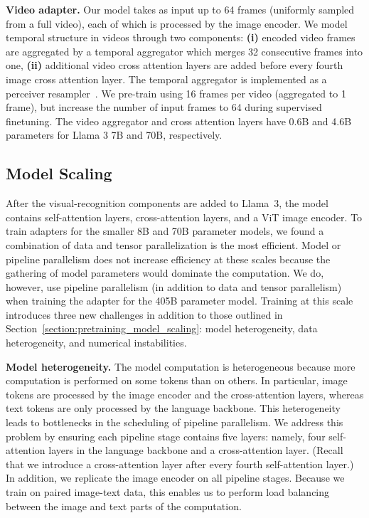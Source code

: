 \textbf{Video adapter.} Our model takes as input up to 64 frames (uniformly sampled from a full video), each of which is processed by the image encoder. We model temporal structure in videos through two components: \textbf{(i)} encoded video frames are aggregated by a temporal aggregator which merges 32 consecutive frames into one, \textbf{(ii)} additional video cross attention layers are added before every fourth image cross attention layer. The temporal aggregator is implemented as a perceiver resampler~\citep{jaegle2021perceiver,alayrac2022flamingo}. We pre-train using 16 frames per video (aggregated to 1 frame), but increase the number of input frames to 64 during supervised finetuning. The video aggregator and cross attention layers have 0.6B and 4.6B parameters for Llama 3 7B and 70B, respectively. 

\subsection{Model Scaling}
\label{section:vision_model_scaling}

After the visual-recognition components are added to Llama~3, the model contains self-attention layers, cross-attention layers, and a ViT image encoder. To train adapters for the smaller 8B and 70B parameter models, we found a combination of data and tensor parallelization is the most efficient. Model or pipeline parallelism does not increase efficiency at these scales because the gathering of model parameters would dominate the computation. We do, however, use pipeline parallelism (in addition to data and tensor parallelism) when training the adapter for the 405B parameter model. Training at this scale introduces three new challenges in addition to those outlined in Section~\ref{section:pretraining_model_scaling}: model heterogeneity, data heterogeneity, and numerical instabilities.

\textbf{Model heterogeneity.} The model computation is heterogeneous because more computation is performed on some tokens than on others. In particular, image tokens are processed by the image encoder and the cross-attention layers, whereas text tokens are only processed by the language backbone. This heterogeneity leads to bottlenecks in the scheduling of pipeline parallelism. We address this problem by ensuring each pipeline stage contains five layers: namely, four self-attention layers in the language backbone and a cross-attention layer. (Recall that we introduce a cross-attention layer after every fourth self-attention layer.) In addition, we replicate the image encoder on all pipeline stages. Because we train on paired image-text data, this enables us to perform load balancing between the image and text parts of the computation.

